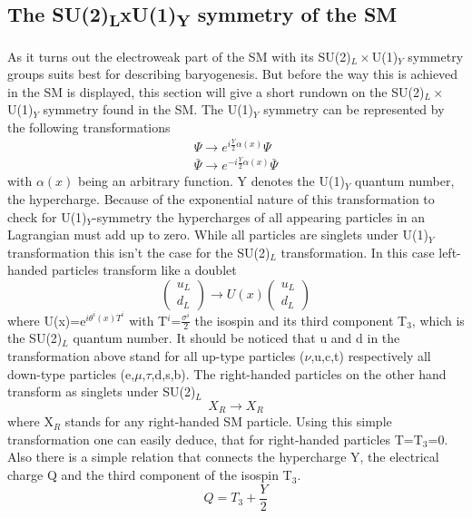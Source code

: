 \subsection{The SU(2)\textsubscript{L}xU(1)\textsubscript{Y} symmetry of the SM}
As it turns out the electroweak part of the SM with its SU(2)$_L\times$U(1)$_Y$ symmetry groups suits best for describing baryogenesis. But before the way this is achieved in the SM is displayed, this section will give a short rundown on the SU(2)$_L\times$U(1)$_Y$ symmetry found in the SM.\newline
The U(1)$_Y$ symmetry can be represented by the following transformations
\begin{align*}
\Psi \longrightarrow e^{i\frac{Y}{2}\alpha(x)}\Psi\\
\bar{\Psi} \longrightarrow e^{-i\frac{Y}{2}\alpha(x)}\bar{\Psi}
\end{align*}
with $\alpha(x)$ being an arbitrary function. Y denotes the U(1)$_Y$ quantum number, the hypercharge. Because of the exponential nature of this transformation to check for U(1)$_Y$-symmetry the hypercharges of all appearing particles in an Lagrangian must add up to zero. \newline
While all particles are singlets under U(1)$_Y$ transformation this isn't the case for the SU(2)$_L$ transformation. In this case left-handed particles transform like a doublet
\begin{equation*}
	\left(\begin{array}{c}u_L\\d_L\end{array}\right)\longrightarrow U(x)	\left(\begin{array}{c}u_L\\d_L\end{array}\right)
\end{equation*}
where U(x)=e$^{i\theta^i(x)T^i}$ with T$^i$=$\frac{\sigma^i}{2}$ the isospin and its third component T$_3$, which is the SU(2)$_L$ quantum number. It should be noticed that u and d in the transformation above stand for all up-type particles ($\nu$,u,c,t) respectively all down-type particles (e,$\mu$,$\tau$,d,s,b). The right-handed particles on the other hand transform as singlets under SU(2)$_L$
\begin{equation*}
	X_R\longrightarrow X_R
\end{equation*}
where X$_R$ stands for any right-handed SM particle. Using this simple transformation one can easily deduce, that for right-handed particles T=T$_3$=0.\newline
Also there is a simple relation that connects the hypercharge Y, the electrical charge Q and the third component of the isospin T$_3$.
\begin{equation}
Q=T_3+\frac{Y}{2}
\label{eq:ladung_hyperladung_isospin}
\end{equation}
